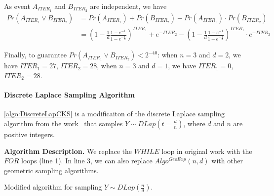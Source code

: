     As event $A_{ITER_1}$ and $B_{ITER_2}$ are independent, we have
    \begin{equation}
        \begin{split}
            Pr\left(A_{ITER_1}\lor B_{ITER_2} \right) &= Pr\left(A_{ITER_1} \right)+   Pr\left(B_{ITER_2}\right)-Pr\left(A_{ITER_1} \right)\cdot   Pr\left(B_{ITER_2}\right)\\
            &=\left(1-\frac{1}{d}\frac{1-e^{-1}}{1-e^{-\frac{1}{d}}}\right) ^{ITER_1} + e^{- ITER_2 }-\left(1-\frac{1}{d}\frac{1-e^{-1}}{1-e^{-\frac{1}{d}}}\right) ^{ITER_1} \cdot e^{- ITER_2 }
        \end{split}
    \end{equation}

    Finally, to guarantee $Pr\left(A_{ITER_1}\lor B_{ITER_2} \right)<2^{-40}$:
    when $n=3$ and $d=2$, we have $ITER_1=27$, $ITER_2=28$,
    when $n=3$ and $d=1$, we have $ITER_1=0$, $ITER_2=28$.


    \paragraph{Discrete Laplace Sampling Algorithm}
    \label{para:DiscrettLaplaceSamplingAlgorithm}
    \autoref{algo:DiscreteLapCKS} is a modificaiton of the discrete Laplace sampling algorithm from the work~\cite{canonne2020discrete} that samples $Y\sim DLap\left( t=\frac{d}{n}\right)$, where $d$ and $n$ are positive integers.

    \textbf{Algorithm Description.}
    We replace the $WHILE$ loop in original work with the $FOR$ loops (line 1).
    In line 3, we can also replace $Algo^{GeoExp}\left(n,d\right)$ with other geometric sampling algorithms.

    \begin{algorithm}[tbh!]
        \centering
        \caption{Modified algorithm for sampling $Y \sim  DLap\left(\frac{n}{d}\right)$.}
        \label{algo:DiscreteLapCKS}
    \end{algorithm}
    \FloatBarrier

